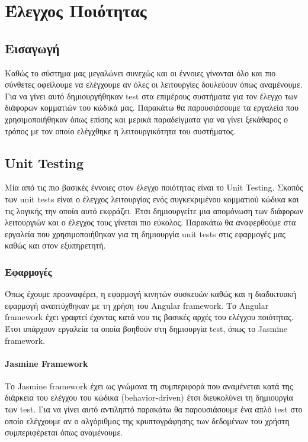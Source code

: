\chapter{Έλεγχος Ποιότητας}

\section{Εισαγωγή}
Καθώς το σύστημα μας μεγαλώνει συνεχώς και οι έννοιες γίνονται όλο και πιο σύνθετες οφείλουμε να ελέγχουμε αν όλες οι λειτουργίες δουλεύουν όπως αναμένουμε. Για να γίνει αυτό δημιουργήθηκαν test στα επιμέρους συστήματα για τον έλεγχο των διάφορων κομματιών του κώδικά μας. Παρακάτω θα παρουσιάσουμε τα εργαλεία που χρησιμοποιήθηκαν όπως επίσης και μερικά παραδείγματα για να γίνει ξεκάθαρος ο τρόπος με τον οποίο ελέγχθηκε η λειτουργικότητα του συστήματος.

\section{Unit Testing}
Μία από τις πιο βασικές έννοιες στον έλεγχο ποιότητας είναι το Unit Testing. Σκοπός των unit tests είναι ο έλεγχος λειτουργίας ενός συγκεκριμένου κομματιού κώδικα και τις λογικής την οποία αυτό εκφράζει. Έτσι δημιουργείτε μια απομόνωση των διάφορων λειτουργιών και ο έλεγχος τους γίνεται πιο εύκολος. Παρακάτω θα αναφερθούμε στα εργαλεία που χρησιμοποιήθηκαν για τη δημιουργία unit tests στις εφαρμογές μας καθώς και στον εξυπηρετητή.

\subsection{Εφαρμογές}
Όπως έχουμε προαναφέρει, η εφαρμογή κινητών συσκευών καθώς και η διαδικτυακή εφαρμογή αναπτύχθηκαν με τη χρήση του Angular framework. Το Angular framework έχει γραφτεί έχοντας κατά νου τις βασικές αρχές του ελέγχου ποιότητας. Έτσι υπάρχουν εργαλεία τα οποία βοηθούν στη δημιουργία test, όπως το Jasmine framework. 

\subsubsection{Jasmine Framework}
Το Jasmine framework έχει ως γνώμονα τη συμπεριφορά που αναμένεται κατά της διάρκεια του ελέγχου του κώδικα (behavior-driven) έτσι διευκολύνει τη δημιουργία των test. Για να γίνει αυτό αντιληπτό παρακάτω θα παρουσιάσουμε ένα απλό test στο οποίο ελέγχουμε αν ο αλγόριθμος της κρυπτογράφησης των δεδομένων του χρήστη συμπεριφέρεται όπως αναμένουμε.

